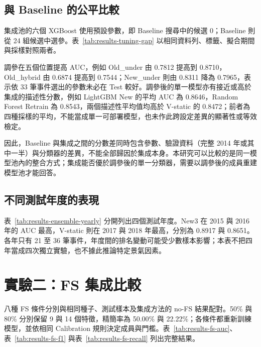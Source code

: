 \subsection{與 Baseline 的公平比較}

集成池的六個 XGBoost 使用預設參數，即 Baseline 搜尋中的候選 0；Baseline 則從 24 組候選中選參。表~\ref{tab:results-tuning-gap} 以相同資料列、標籤、擬合期間與採樣對照兩者。



調參在五個位置提高 AUC，例如 Old\_under 由 0.7812 提高到 0.8710，Old\_hybrid 由 0.6874 提高到 0.7544；New\_under 則由 0.8311 降為 0.7965，表示依 33 筆事件選出的參數未必在 Test 較好。調參後的單一模型亦有接近或高於集成的描述性分數，例如 LightGBM New 的平均 AUC 為 0.8646，Random Forest Retrain 為 0.8543，兩個描述性平均值均高於 V-static 的 0.8472；前者為四種採樣的平均，不能當成單一可部署模型，也未作此跨設定差異的顯著性或等效檢定。

因此，Baseline 與集成之間的分數差同時包含參數、驗證資料（完整 2014 年或其中一半）與分類器的差異，不能全部歸因於集成本身。本研究可以比較的是同一模型池內的整合方式；集成能否優於調參後的單一分類器，需要以調參後的成員重建模型池才能回答。

\subsection{不同測試年度的表現}



表~\ref{tab:results-ensemble-yearly} 分開列出四個測試年度。New3 在 2015 與 2016 年的 AUC 最高，V-static 則在 2017 與 2018 年最高，分別為 0.8917 與 0.8651。各年只有 21 至 36 筆事件，年度間的排名變動可能受少數樣本影響；本表不把四年當成四次獨立實驗，也不據此推論特定景氣因素。

\section{實驗二：FS 集成比較}\label{sec:results-experiment2}

八種 FS 條件分別與相同種子、測試樣本及集成方法的 no-FS 結果配對。50\% 與 80\% 分別保留 9 與 14 個特徵，精簡率為 50.00\% 與 22.22\%；各條件都重新訓練模型，並依相同 Calibration 規則決定成員與門檻。表~\ref{tab:results-fs-auc}、表~\ref{tab:results-fs-f1} 與表~\ref{tab:results-fs-recall} 列出完整結果。





